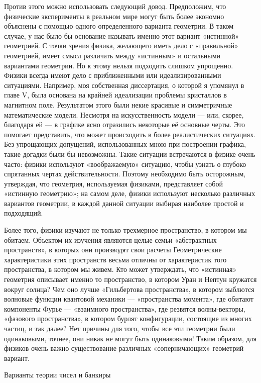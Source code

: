 \documentclass[../main.tex]{subfiles}
\begin{document}
Против этого можно использовать следующий довод. Предположим, что физические эксперименты в реальном мире могут быть более экономно объяснены с помощью одного определенного варианта геометрии. В таком случае, у нас было бы основание называть именно этот вариант «истинной» геометрией. С точки зрения физика, желающего иметь дело с «правильной» геометрией, имеет смысл различать между «истинным» и остальными вариантами геометрии. Но к этому нельзя подходить слишком упрощенно. Физики всегда имеют дело с приближенными или идеализированными ситуациями. Например, моя собственная диссертация, о которой я упомянул в главе V, была основана на крайней идеализации проблемы кристаллов в магнитном поле. Результатом этого были некие красивые и симметричные математические модели. Несмотря на искусственность модели --- или, скорее, благодаря ей --- в графике ясно отразились некоторые её основные черты. Это помогает представить, что может происходить в более реалистических ситуациях. Без упрощающих допущений, использованных мною при построении графика, такие догадки были бы невозможны. Такие ситуации встречаются в физике очень часто: физики используют «воображаемую» ситуацию, чтобы узнать о глубоко спрятанных чертах действительности. Поэтому необходимо быть осторожным, утверждая, что геометрия, используемая физиками, представляет собой «истинную геометрию»; на самом деле, физики используют несколько различных вариантов геометрии, в каждой данной ситуации выбирая наиболее простой и подходящий.

Более того, физики изучают не только трехмерное пространство, в котором мы обитаем. Объектом их изучения являются целые семьи «абстрактных пространств», в которых они производят свои расчеты Геометрические характеристики этих пространств весьма отличны от характеристик того пространства, в котором мы живем. Кто может утверждать, что «истинная» геометрия описывает именно то пространство, в котором Уран и Нептун кружатся вокруг солнца? Чем оно лучше «Гильбертова пространства», в котором зыблются волновые функции квантовой механики --- «пространства момента», где обитают компоненты Фурье --- «взаимного пространства», где резвятся волны-векторы, «фазового пространства», в котором бурлят конфигурации, состоящие из многих частиц, и так далее? Нет причины для того, чтобы все эти геометрии были одинаковыми, точнее, они никак не могут быть одинаковыми! Таким образом, для физиков очень важно существование различных «соперничающих» геометрий вариант.

Варианты теории чисел и банкиры
\end{document}
